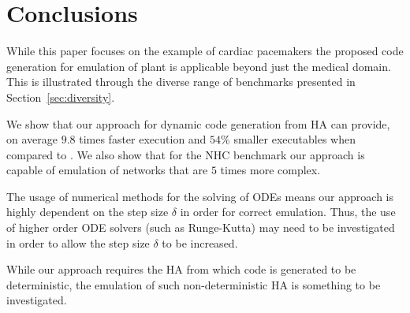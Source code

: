 \section{Conclusions}

While this paper focuses on the example of cardiac pacemakers the proposed code generation for emulation of plant is applicable beyond just the medical domain.
This is illustrated through the diverse range of benchmarks presented in Section~\ref{sec:diversity}.

We show that our approach for dynamic code generation from \ac{HA} can provide, on average $9.8$ times faster execution and $54\%$ smaller executables when compared to \simulink.
We also show that for the \acf{NHC} benchmark our approach is capable of emulation of networks that are $5$ times more complex.

The usage of numerical methods for the solving of \acp{ODE} means our approach is highly dependent on the step size $\delta$ in order for correct emulation.
Thus, the use of higher order \ac{ODE} solvers (such as Runge-Kutta) may need to be investigated in order to allow the step size $\delta$ to be increased.

While our approach requires the \ac{HA} from which code is generated to be deterministic, the emulation of such non-deterministic \ac{HA} is something to be investigated.
